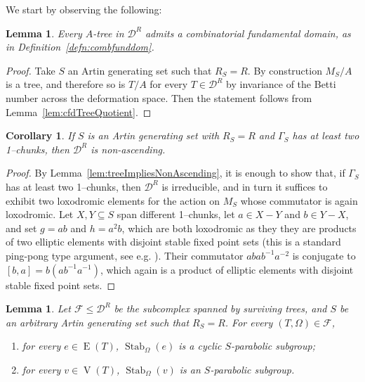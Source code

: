 \documentclass[svgnames]{amsart}
\theoremstyle{plain}
\newtheorem{lemma}[thm]{Lemma}
\newtheorem{cor}[thm]{Corollary}
\theoremstyle{definition}
\newcommand{\crush}[2]{\mathcal{#1}^{#2}}
\newcommand{\edge}[1]{\operatorname{E}(#1)}
\newcommand{\Stab}[2]{\operatorname{Stab}_{#1}\left(#2\right)}
\newcommand{\ver}[1]{\operatorname{V}(#1)}
\begin{document}
\noindent We start by observing the following:
\begin{lemma}
    Every $A$-tree in $\crush D {R}$ admits a combinatorial fundamental domain, as in Definition~\ref{defn:combfunddom}.
\end{lemma}

\begin{proof} Take $S$ an Artin generating set such that $R_S = R$. By construction $M_S/A$ is a tree, and therefore so is $T/A$ for every $T\in \crush D {R}$ by invariance of the Betti number across the deformation space. Then the statement follows from Lemma~\ref{lem:cfdTreeQuotient}. \end{proof}


\begin{cor}\label{lem:crushNonAscending}
    If $S$ is an Artin generating set with $R_S = R$ and $\Gamma_S$ has at least two 1--chunks, then $\crush D {R}$ is non-ascending.
\end{cor}
\begin{proof}
    By Lemma~\ref{lem:treeImpliesNonAscending}, it is enough to show that, if $\Gamma_S$ has at least two 1--chunks, then $\crush D {R}$ is irreducible, and in turn it suffices to exhibit two loxodromic elements for the action on $M_S$ whose commutator is again loxodromic. Let $X,Y\subseteq S$ span different 1--chunks, let $a\in X-Y$ and $b\in Y-X$, and set $g=ab$ and $h=a^2b$, which are both loxodromic as they they are products of two elliptic elements with disjoint stable fixed point sets (this is a standard ping-pong type argument, see e.g. \cite{pingpong}). Their commutator $abab^{-1}a^{-2}$ is conjugate to $[b,a]=b(ab^{-1}a^{-1})$, which again is a product of elliptic elements with disjoint stable fixed point sets.
\end{proof}



\begin{lemma}
    \label{lem:edges stab reduced trees}
    Let $\mathcal F\le\crush D {R}$ be the subcomplex spanned by surviving trees, and $S$ be an arbitrary Artin generating set such that $R_S = R$. For every $(T,\Omega)\in\mathcal F$,
    \begin{enumerate}
        \item for every $e\in\edge T$, $\Stab{\Omega}{e}$ is a cyclic $S$-parabolic subgroup;
        \item for every $v \in \ver T$, $\Stab{\Omega}{v}$ is an $S$-parabolic subgroup.
    \end{enumerate}
\end{lemma}
\end{document}

